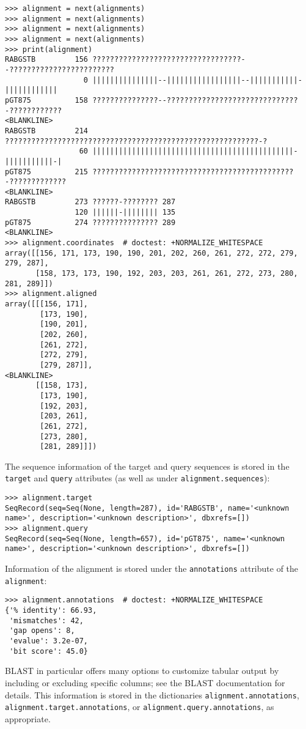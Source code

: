 \begin{verbatim}
>>> alignment = next(alignments)
>>> alignment = next(alignments)
>>> alignment = next(alignments)
>>> alignment = next(alignments)
>>> print(alignment)
RABGSTB         156 ??????????????????????????????????--????????????????????????
                  0 |||||||||||||||--|||||||||||||||||--|||||||||||-||||||||||||
pGT875          158 ???????????????--??????????????????????????????-????????????
<BLANKLINE>
RABGSTB         214 ??????????????????????????????????????????????????????????-?
                 60 ||||||||||||||||||||||||||||||||||||||||||||||-|||||||||||-|
pGT875          215 ??????????????????????????????????????????????-?????????????
<BLANKLINE>
RABGSTB         273 ??????-???????? 287
                120 ||||||-|||||||| 135
pGT875          274 ??????????????? 289
<BLANKLINE>
>>> alignment.coordinates  # doctest: +NORMALIZE_WHITESPACE
array([[156, 171, 173, 190, 190, 201, 202, 260, 261, 272, 272, 279, 279, 287],
       [158, 173, 173, 190, 192, 203, 203, 261, 261, 272, 273, 280, 281, 289]])
>>> alignment.aligned
array([[[156, 171],
        [173, 190],
        [190, 201],
        [202, 260],
        [261, 272],
        [272, 279],
        [279, 287]],
<BLANKLINE>
       [[158, 173],
        [173, 190],
        [192, 203],
        [203, 261],
        [261, 272],
        [273, 280],
        [281, 289]]])
\end{verbatim}
The sequence information of the target and query sequences is stored in the \verb|target| and \verb|query| attributes (as well as under \verb|alignment.sequences|):
\begin{verbatim}
>>> alignment.target
SeqRecord(seq=Seq(None, length=287), id='RABGSTB', name='<unknown name>', description='<unknown description>', dbxrefs=[])
>>> alignment.query
SeqRecord(seq=Seq(None, length=657), id='pGT875', name='<unknown name>', description='<unknown description>', dbxrefs=[])
\end{verbatim}
Information of the alignment is stored under the \verb|annotations| attribute of the \verb|alignment|:
\begin{verbatim}
>>> alignment.annotations  # doctest: +NORMALIZE_WHITESPACE
{'% identity': 66.93,
 'mismatches': 42,
 'gap opens': 8,
 'evalue': 3.2e-07,
 'bit score': 45.0}
\end{verbatim}
BLAST in particular offers many options to customize tabular output by including or excluding specific columns; see the BLAST documentation for details. This information is stored in the dictionaries \verb|alignment.annotations|, \verb|alignment.target.annotations|, or \verb|alignment.query.annotations|, as appropriate.


